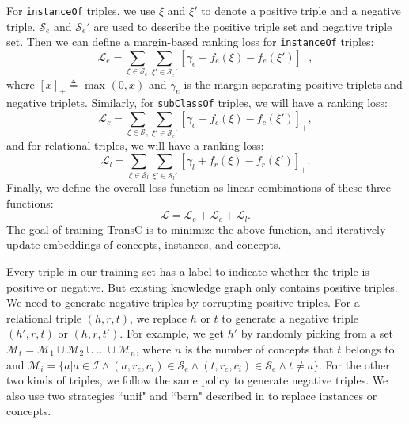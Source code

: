 \documentclass[11pt,a4paper]{article}
\begin{document}
  For \texttt{instanceOf} triples, we use $\xi$ and $\xi'$ to denote a
  positive triple and a negative triple. $\mathcal{S}_e$ and $\mathcal{S}_e'$ are used to describe the positive triple set and 
  negative triple set. Then we can define a margin-based ranking loss for \texttt{instanceOf} triples:
  \begin{equation}
    \mathcal{L}_e = \sum_{\xi \in \mathcal{S}_e} \sum_{\xi' \in \mathcal{S}_e'}[\gamma_e + f_e(\xi) - f_e(\xi')]_{+},
  \end{equation}
  where $[x]_{+} \triangleq$ max $(0, x)$ and $\gamma_e$ is the margin separating positive triplets and negative triplets. 
  Similarly, for \texttt{subClassOf} triples, we will have a ranking loss:
  \begin{equation}
    \mathcal{L}_c = \sum_{\xi \in \mathcal{S}_c} \sum_{\xi' \in \mathcal{S}_c'}[\gamma_c + f_c(\xi) - f_c(\xi')]_{+},
  \end{equation}
  and for relational triples, we will have a ranking loss:
  \begin{equation}
    \mathcal{L}_l = \sum_{\xi \in \mathcal{S}_l} \sum_{\xi' \in \mathcal{S}_l'}[\gamma_l + f_r(\xi) - f_r(\xi')]_{+}.
  \end{equation}
  Finally, we define the overall loss function as linear combinations of these three functions:
  \begin{equation}
    \mathcal{L} = \mathcal{L}_e + \mathcal{L}_c + \mathcal{L}_l.
  \end{equation}
  The goal of training TransC is to minimize the
  above function, and iteratively update embeddings of concepts, instances, and concepts.
  
  Every triple in our training set has a label to indicate whether the triple is positive  or
  negative. But existing knowledge graph only contains positive triples. We need to generate negative triples by
  corrupting positive triples. For a relational triple $(h, r, t)$, we replace $h$ or $t$ to generate a negative triple
  $(h', r, t)$ or $(h, r, t')$. For example, we get $h'$ by randomly picking from a set 
  $\mathcal{M}_t = \mathcal{M}_1 \cup \mathcal{M}_2 \cup \dots \cup \mathcal{M}_n$, where $n$ is the number of concepts that $t$
  belongs to and $\mathcal{M}_i = \{a | a \in \mathcal{I} \land (a, r_e, c_i) \in \mathcal{S}_e \land (t, r_e, c_i) \in \mathcal{S}_e \land t \ne a \}$.
  For the other two kinds of triples, we follow the same policy to generate negative triples. We also use
  two strategies ``unif" and ``bern" described in \cite{TransH} to replace instances or concepts.
  
\end{document}

